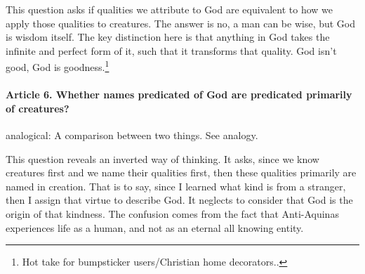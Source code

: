 \documentclass{ucetd}
\begin{document}
This question asks if qualities we attribute to God are equivalent to how we apply those qualities to creatures. The answer is no, a man can be wise, but God is wisdom itself. The key distinction here is that anything in God takes the infinite and perfect form of it, such that it transforms that quality. God isn't good, God is goodness.\footnote{Hot take for bumpsticker users/Christian home decorators..}

\paragraph{Article 6. Whether names predicated of God are predicated primarily of creatures?}
\gls{analogical}: A comparison between two things. See analogy.

This question reveals an inverted way of thinking. It asks, since we know creatures first and we name their qualities first, then these qualities primarily are named in creation. That is to say, since I learned what kind is from a stranger, then I assign that virtue to describe God. It neglects to consider that God is the origin of that kindness. The confusion comes from the fact that Anti-Aquinas experiences life as a human, and not as an eternal all knowing entity.
\end{document}

